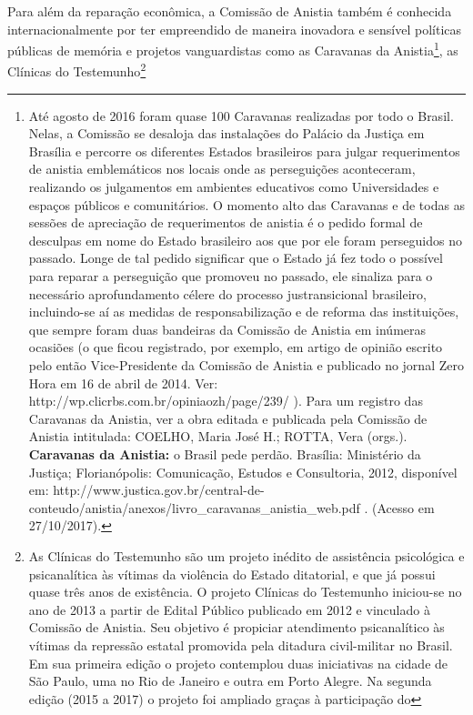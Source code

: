 Para além da reparação econômica, a Comissão de Anistia também é
conhecida internacionalmente por ter empreendido de maneira inovadora e
sensível políticas públicas de memória e projetos vanguardistas como as
Caravanas da Anistia\footnote{Até agosto de 2016 foram quase 100
  Caravanas realizadas por todo o Brasil. Nelas, a Comissão se desaloja
  das instalações do Palácio da Justiça em Brasília e percorre os
  diferentes Estados brasileiros para julgar requerimentos de anistia
  emblemáticos nos locais onde as perseguições aconteceram, realizando
  os julgamentos em ambientes educativos como Universidades e espaços
  públicos e comunitários. O momento alto das Caravanas e de todas as
  sessões de apreciação de requerimentos de anistia é o pedido formal de
  desculpas em nome do Estado brasileiro aos que por ele foram
  perseguidos no passado. Longe de tal pedido significar que o Estado já
  fez todo o possível para reparar a perseguição que promoveu no
  passado, ele sinaliza para o necessário aprofundamento célere do
  processo justransicional brasileiro, incluindo-se aí as medidas de
  responsabilização e de reforma das instituições, que sempre foram duas
  bandeiras da Comissão de Anistia em inúmeras ocasiões (o que ficou
  registrado, por exemplo, em artigo de opinião escrito pelo então
  Vice-Presidente da Comissão de Anistia e publicado no jornal Zero Hora
  em 16 de abril de 2014. Ver:
  http://wp.clicrbs.com.br/opiniaozh/page/239/ ). Para um registro das
  Caravanas da Anistia, ver a obra editada e publicada pela Comissão de
  Anistia intitulada: COELHO, Maria José H.; ROTTA, Vera (orgs.).
  \textbf{Caravanas da Anistia:} o Brasil pede perdão. Brasília:
  Ministério da Justiça; Florianópolis: Comunicação, Estudos e
  Consultoria, 2012, disponível em:
  http://www.justica.gov.br/central-de-conteudo/anistia/anexos/livro\_caravanas\_anistia\_web.pdf
  . (Acesso em 27/10/2017).}, as Clínicas do Testemunho\footnote{As
  Clínicas do Testemunho são um projeto inédito de assistência
  psicológica e psicanalítica às vítimas da violência do Estado
  ditatorial, e que já possui quase três anos de existência. O projeto
  Clínicas do Testemunho iniciou-se no ano de 2013 a partir de Edital
  Público publicado em 2012 e vinculado à Comissão de Anistia. Seu
  objetivo é propiciar atendimento psicanalítico às vítimas da repressão
  estatal promovida pela ditadura civil-militar no Brasil. Em sua
  primeira edição o projeto contemplou duas iniciativas na cidade de São
  Paulo, uma no Rio de Janeiro e outra em Porto Alegre. Na segunda
  edição (2015 a 2017) o projeto foi ampliado graças à participação do
}
